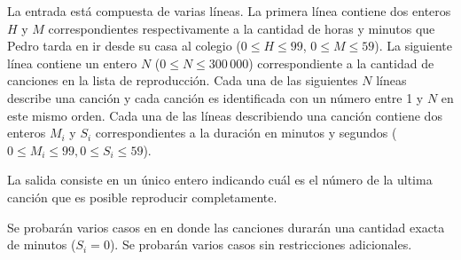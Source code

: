 \documentclass{oci}
\begin{document}
\begin{inputDescription}
  La entrada está compuesta de varias líneas.
  La primera línea contiene dos enteros $H$ y $M$ correspondientes
  respectivamente a la cantidad de horas y minutos que Pedro tarda en ir desde su
  casa al colegio ($0\leq H\leq 99$, $0\leq M\leq 59$).
  La siguiente línea contiene un entero $N$ ($0\leq N\leq 300\,000$)
  correspondiente a la cantidad de canciones en la lista de reproducción.
  Cada una de las siguientes $N$ líneas describe una canción y cada canción es
  identificada con un número entre 1 y $N$ en este mismo orden.
  Cada una de las líneas describiendo una canción contiene dos enteros $M_i$ y $S_i$
  correspondientes a la duración en minutos y segundos ($0\leq
  M_i\leq 99, 0\leq S_i\leq 59$).
\end{inputDescription}

\begin{outputDescription}
  La salida consiste en un único entero indicando cuál es el número 
de la ultima canción que es posible reproducir completamente.
\end{outputDescription}

\begin{scoreDescription}
   Se probarán varios casos en en donde las canciones durarán una cantidad
  exacta de minutos ($S_i = 0$).
   Se probarán varios casos sin restricciones adicionales. 
\end{scoreDescription}

\begin{sampleDescription}
\end{sampleDescription}
\end{document}
